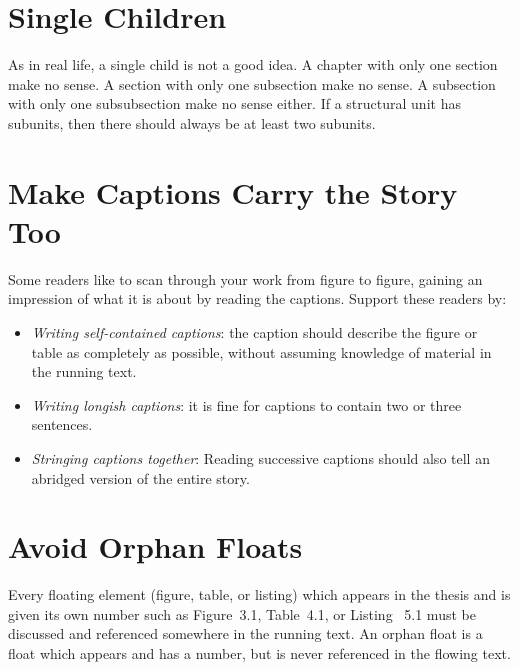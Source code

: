 \section{Single Children}

As in real life, a single child is not a good idea. A chapter with
only one section make no sense. A section with only one subsection
make no sense. A subsection with only one subsubsection make no sense
either. If a structural unit has subunits, then there should
always be at least two subunits.







\section{Make Captions Carry the Story Too}

Some readers like to scan through your work from figure to figure,
gaining an impression of what it is about by reading the captions.
Support these readers by:
\begin{itemize}
\item \emph{Writing self-contained captions}: the caption
should describe the figure or table as completely as possible, without
assuming knowledge of material in the running text.

\item \emph{Writing longish captions}: it is fine for
captions to contain two or three sentences.

\item \emph{Stringing captions together}: Reading successive captions
should also tell an abridged version of the entire story.
\end{itemize}




\section{Avoid Orphan Floats}

Every floating element (figure, table, or listing) which appears in
the thesis and is given its own number such as Figure~3.1, Table~4.1,
or Listing ~5.1 must be discussed and referenced somewhere in the
running text. An orphan float is a float which appears and has a
number, but is never referenced in the flowing text.


